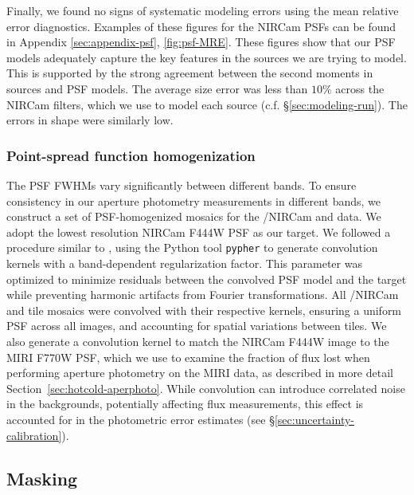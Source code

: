 \documentclass[longauth]{aa}
\begin{document}
Finally, we found no signs of systematic modeling errors using the mean relative error diagnostics. Examples of these figures for the NIRCam PSFs can be found in Appendix \ref{sec:appendix-psf}, \ref{fig:psf-MRE}. These figures show that our PSF models adequately capture the key features in the sources we are trying to model. This is supported by the strong agreement between the second moments in sources and PSF models. The average size error was less than $10\%$ across the NIRCam filters, which we use to model each source (c.f. \S\ref{sec:modeling-run}). The errors in shape were similarly low. 


\subsubsection{Point-spread function homogenization} \label{sec:PSF-homogenization}
The PSF FWHMs vary significantly between different bands. To ensure consistency in our aperture photometry measurements in different bands, we construct a set of PSF-homogenized mosaics for the \JWST/NIRCam and \hst{} data. We adopt the lowest resolution NIRCam F444W PSF as our target. We followed a procedure similar to \cite{weaver_cosmos2020_2022}, using the Python tool \texttt{pypher} \citep{pypher} to generate convolution kernels with a band-dependent regularization factor. This parameter was optimized to minimize residuals between the convolved PSF model and the target while preventing harmonic artifacts from Fourier transformations. All \JWST/NIRCam and \hst{} tile mosaics were convolved with their respective kernels, ensuring a uniform PSF across all images, and accounting for spatial variations between tiles.
We also generate a convolution kernel to match the NIRCam F444W image to the MIRI F770W PSF, which we use to examine the fraction of flux lost when performing aperture photometry on the MIRI data, as described in more detail Section~\ref{sec:hotcold-aperphoto}.
While convolution can introduce correlated noise in the  backgrounds, potentially affecting flux measurements, this effect is accounted for in the photometric error estimates (see \S\ref{sec:uncertainty-calibration}).



\subsection{Masking} \label{sec:masking}
\end{document}
